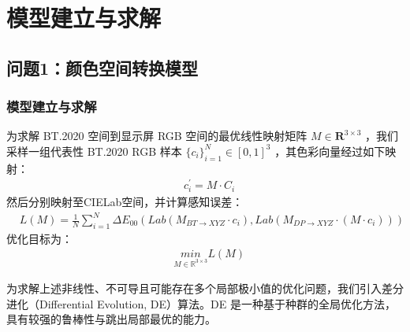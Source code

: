 \chapter[\hspace{0pt}模型建立与求解]{{\heiti{}\hspace{0pt}模型建立与求解}}\label{chapter3: 模型建立与求解}
\removelofgap
\removelotgap

\section[\hspace{-2pt}问题1：颜色空间转换模型]{{\heiti{} \hspace{-8pt}问题1：颜色空间转换模型}}\label{section3: 问题1：颜色空间转换模型}


\subsection[\hspace{-2pt}模型建立与求解]{{\heiti{} \hspace{-8pt}模型建立与求解}}\label{section3: 模型建立与求解}


为求解 BT.2020 空间到显示屏 RGB 空间的最优线性映射矩阵 $M\in \mathbf{R}^{3\times 3}$ ，我们采样一组代表性 BT.2020 RGB 样本 $\{c_{i}\}_{i=1}^{N}\in [0,1]^{3}$ ，其色彩向量经过如下映射：
\begin{equation}
\begin{aligned}
  &c^{'}_{i} = M\cdot C_{i}
\end{aligned}
\end{equation}
然后分别映射至CIELab空间，并计算感知误差：
\begin{equation}
\begin{aligned}
 &L(M)=\frac{1}{N}\sum_{i=1}^{N}\Delta E_{00}(Lab(M_{BT\rightarrow XYZ} \cdot c_{i}), Lab(M_{DP\rightarrow XYZ}\cdot (M\cdot c_{i})))
\end{aligned}
\end{equation}
优化目标为：
\begin{equation}
\begin{aligned}
  &\underset {M\in \mathbb{R}^{3\times 3}}{min}L(M)
\end{aligned}
\end{equation}

为求解上述非线性、不可导且可能存在多个局部极小值的优化问题，我们引入差分进化（Differential Evolution, DE）算法。DE 是一种基于种群的全局优化方法，具有较强的鲁棒性与跳出局部最优的能力。

